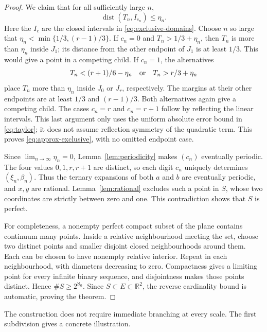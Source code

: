 \documentclass[11pt,a4paper]{amsart}
\numberwithin{equation}{section}
\theoremstyle{definition}
\begin{document}
\begin{proof}
We claim that for all sufficiently large \(n\),
\begin{equation}\label{eq:approx-exclusive}
\operatorname{dist}(T_n,I_{c_n})\leq\eta_n.
\end{equation}
Here the \(I_c\) are the closed intervals in
\eqref{eq:exclusive-domains}.
Choose \(n\) so large that
\(\eta_n<\min\{1/3,(r-1)/3\}\).
If \(c_n=0\) and \(T_n>1/3+\eta_n\), then \(T_n\) is more than
\(\eta_n\) inside \(J_1\); its distance from the other endpoint of
\(J_1\) is at least \(1/3\).
This would give a point in a competing child.
If \(c_n=1\), the alternatives
\[
T_n<(r+1)/6-\eta_n
\quad\hbox{or}\quad
T_n>r/3+\eta_n
\]
place \(T_n\) more than \(\eta_n\) inside \(J_0\) or \(J_r\),
respectively. The margins at their other endpoints are at least
\(1/3\) and \((r-1)/3\).
Both alternatives again give a competing child.
The cases \(c_n=r\) and \(c_n=r+1\) follow by reflecting the linear
intervals. This last argument only uses the uniform absolute error
bound in \eqref{eq:taylor}; it does not assume reflection symmetry
of the quadratic term.
This proves \eqref{eq:approx-exclusive}, with no omitted endpoint
case.

Since \(\displaystyle\lim_{n\to\infty}\eta_n=0\),
Lemma~\ref{lem:periodicity} makes \((c_n)\) eventually periodic.
The four values \(0,1,r,r+1\) are distinct, so each digit \(c_n\)
uniquely determines \((\xi_n,\beta_n)\).
Thus the ternary expansions of both \(a\) and \(b\) are eventually
periodic, and \(x,y\) are rational.
Lemma~\ref{lem:rational} excludes such a point in \(S\), whose two
coordinates are strictly between zero and one. This contradiction
shows that \(S\) is perfect.

For completeness, a nonempty perfect compact subset of the plane
contains continuum many points. Inside a relative neighbourhood
meeting the set, choose two distinct points and smaller disjoint
closed neighbourhoods around them. Each can be chosen to have
nonempty relative interior. Repeat in each neighbourhood, with
diameters decreasing to zero. Compactness gives a limiting point
for every infinite binary sequence, and disjointness makes those
points distinct. Hence \(\#S\geq2^{\aleph_0}\).
Since \(S\subset E\subset\mathbb R^2\), the reverse cardinality bound
is automatic, proving the theorem.
\end{proof}

The construction does not require immediate branching at every scale.
The first subdivision gives a concrete illustration.
\end{document}
